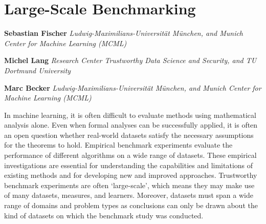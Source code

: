\hypertarget{sec-large-benchmarking}{%
\chapter{Large-Scale Benchmarking}\label{sec-large-benchmarking}}

\vspace{-15mm}

\textbf{Sebastian Fischer} \newline 
\emph{Ludwig-Maximilians-Universität München, and Munich Center for
Machine Learning (MCML)}

\textbf{Michel Lang} \newline  \emph{Research Center Trustworthy Data
Science and Security, and TU Dortmund University}

\textbf{Marc Becker} \newline  \emph{Ludwig-Maximilians-Universität
München, and Munich Center for Machine Learning (MCML)}
\newline \newline 

In machine learning, it is often difficult to evaluate methods using
mathematical analysis alone. Even when formal analyses can be
successfully applied, it is often an open question whether real-world
datasets satisfy the necessary assumptions for the theorems to hold.
Empirical benchmark experiments evaluate
the performance of different algorithms on a wide range of datasets.
These empirical investigations are essential for understanding the
capabilities and limitations of existing methods and for developing new
and improved approaches. Trustworthy benchmark experiments are often
`large-scale', which means they may make use of many datasets, measures,
and learners. Moreover, datasets must span a wide range of domains and
problem types as conclusions can only be drawn about the kind of
datasets on which the benchmark
study was conducted.

